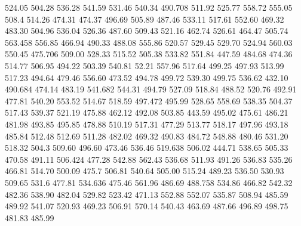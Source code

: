 524.05
504.28
536.28
541.59
531.46
540.34
490.708
511.92
525.77
558.72
555.05
508.4 
514.26 
474.31
474.37
496.69
505.89
487.46
533.11
517.61
552.60
469.32
483.30
504.96
536.04
526.36
487.60
509.43
521.16
462.74
526.61
464.47
505.74
563.458
556.85
466.94
490.33
488.08
555.86
520.57
529.45
529.70
524.94
560.03
550.45
475.706
509.00
528.33
515.52
505.38
533.82
551.84
447.59 
484.68
474.36
514.77
506.95
494.22
503.39
540.81
52.21
557.96
517.64
499.25
497.93
513.99
517.23
494.64
479.46
556.60
473.52
494.78
499.72
539.30
499.75
536.62
432.10
490.684
474.14
483.19
541.682
544.31
494.79
527.09 
518.84
488.52
520.76
492.91
477.81
540.20
553.52
514.67
518.59
497.472
495.99
528.65
558.69
538.35
504.37
517.43
539.37
521.19
475.88
462.12
492.08
503.85
443.59
495.02
475.61
486.21
481.98
493.85
495.85
478.88
510.19
517.31
477.29
513.77
518.17 
497.96
493.18
485.84
512.48
512.69
511.28
482.02 
469.32
490.83
484.72
548.88
480.46
531.20
518.32
504.3 
509.60
496.60
473.46
536.46
519.638
506.02
444.71
538.65
505.33
470.58 
491.11
506.424
477.28
542.88
562.43
536.68
511.93
491.26
536.83
535.26
466.81
514.70
500.09
475.7 
506.81
540.64
505.00
515.24
489.23
536.50
530.93
509.65
531.6 
477.81
534.636
475.46
561.96
486.69
488.758
534.86
466.82
542.32
482.36
538.90
482.04
529.82
523.42
471.13
552.88
552.07
535.87 
508.94
485.59
489.92
541.07
520.93
469.23
506.91
570.14
540.43
463.69
487.66
496.89
498.75
481.83
485.99
